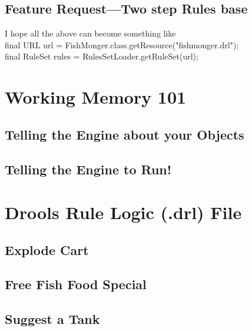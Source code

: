 \subsection{Feature Request---Two step Rules base}
I hope all the above can become something like\\
final URL url = FishMonger.class.getResource("fishmonger.drl");\\
final RuleSet rules = RulesSetLoader.getRuleSet(url);


\clearpage
\section{Working Memory 101}

\subsection{Telling the Engine about your Objects}

\subsection{Telling the Engine to Run!}




\clearpage
\section{Drools Rule Logic (.drl) File}
\subsection{Explode Cart}
\subsection{Free Fish Food Special}

\clearpage
\subsection{Suggest a Tank}
